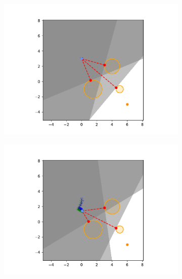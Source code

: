 \begin{figure}[h]
    \centering
    \begin{subfigure}{0.20\textwidth}
        \centering
        \includegraphics[width=\textwidth]{figures/Simulations/sim1circles/frame_0.pdf}
    \end{subfigure}%
    \hfill
    \begin{subfigure}{0.20\textwidth}
        \centering
        \includegraphics[width=\textwidth]{figures/Simulations/sim1circles/frame_1.pdf}
    \end{subfigure}%
    \hfill
    \begin{subfigure}{0.20\textwidth}
        \centering

\end{subfigure}
\end{figure}
